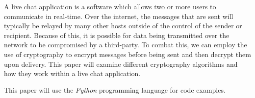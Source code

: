 A live chat application is a software which allows two or more users to communicate in real-time. 
Over the internet, the messages that are sent will typically be relayed by many other hosts
outside of the control of the sender or recipient. Because of this, it is possible for data
being transmitted over the network to be compromised by a third-party. To combat this, we can employ
the use of cryptography to encrypt messages before being sent and then decrypt them upon delivery. 
This paper will examine different cryptography algorithms and how they work within a live chat 
application.  

This paper will use the \textit{Python} programming language for code examples. 
